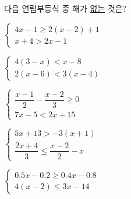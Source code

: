 다음 연립부등식 중 해가 \underline{없는} 것은?
\begin{choicesii}{\rule[-3ex]{0pt}{8ex}$\begin{cases} 4x-1\ge 2(x-2)+1 \\ x+4>2x-1 \end{cases}$}{\rule[-3ex]{0pt}{8ex}$\begin{cases} 4(3-x)<x-8 \\ 2(x-6)<3(x-4) \end{cases}$}{\rule[-3ex]{0pt}{8ex}$\begin{cases} \dfrac{x-1}{2}-\dfrac{x-2}{3}\ge 0 \\[6pt] 7x-5<2x+15 \end{cases}$}{\rule[-3ex]{0pt}{8ex}$\begin{cases} 5x+13>-3(x+1) \\[2pt] \dfrac{2x+4}{3}\le \dfrac{x-2}{2}-x \end{cases}$}{\rule[-3ex]{0pt}{8ex}$\begin{cases} 0.5x-0.2\ge 0.4x-0.8 \\ 4(x-2)\le 3x-14 \end{cases}$}\end{choicesii}
